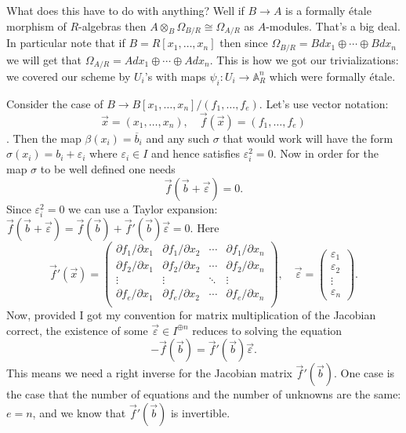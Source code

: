 \documentclass[12pt]{article}
\numberwithin{equation}{section}
\theoremstyle{definition}
\theoremstyle{remark}
\renewcommand{\AA}{\mathbb{A}}
\begin{document}
What does this have to do with anything?
Well if $B \to A$ is a formally \'etale morphism of $R$-algebras then $A\otimes_B \Omega_{B/R} \cong \Omega_{A/R}$ as $A$-modules. 
That's a big deal. 
In particular note that if $B = R[x_1,\ldots,x_n]$ then since $\Omega_{B/R} = B dx_1 \oplus \cdots \oplus B dx_n$ we will get that $\Omega_{A/R} = Adx_1 \oplus \cdots \oplus A dx_n$. 
This is how we got our trivializations: we covered our scheme by $U_i$'s with maps $\psi_i:U_i \to \AA^n_R$ which were formally \'etale. 

Consider the case of $B \to B[x_1,\ldots,x_n]/(f_1,\ldots,f_e)$. 
Let's use vector notation: 
$$\vec{x} = (x_1,\ldots,x_n), \quad \vec{f}(\vec{x}) = (f_1,\ldots,f_e)$$. 
Then the map $\beta(x_i) = \overline{b}_i$ and any such $\sigma$ that would work will have the form $\sigma(x_i) = b_i + \varepsilon_i$ where $\varepsilon_i \in I$ and hence satisfies $\varepsilon_i^2=0$. 
Now in order for the map $\sigma$ to be well defined one needs 
$$ \vec{f}(\vec{b}+\vec{\varepsilon})=0.$$
Since $\varepsilon_i^2=0$ we can use a Taylor expansion: $\vec{f}(\vec{b}+\vec{\varepsilon})=\vec{f}(\vec{b}) + \vec{f}'(\vec{b})\vec{\varepsilon}=0$. 
Here 
$$\vec{f}'(\vec{x}) = \begin{pmatrix}
\partial f_1/\partial x_1 & \partial f_1/\partial x_2 & \cdots & \partial f_1/\partial x_n \\
\partial f_2/\partial x_1 & \partial f_2/\partial x_2 & \cdots & \partial f_2/\partial x_n \\
\vdots & \vdots &\ddots  & \vdots\\
\partial f_e/\partial x_1 & \partial f_e/\partial x_2 & \cdots & \partial f_e/\partial x_n \\
\end{pmatrix}, \quad \vec{\varepsilon} = \begin{pmatrix} \varepsilon_1 \\
\varepsilon_2 \\
\vdots \\
\varepsilon_n
\end{pmatrix}.
$$
Now, provided I got my convention for matrix multiplication of the Jacobian correct, the existence of some $\vec{\varepsilon} \in I^{\oplus n}$ reduces to solving the equation 
\begin{equation}
-\vec{f}(\vec{b}) =\vec{f}'(\vec{b})\vec{\varepsilon}.
\end{equation}
This means we need a right inverse for the Jacobian matrix $\vec{f}'(\vec{b})$. 
One case is the case that the number of equations and the number of unknowns are the same: $e=n$, and we know that $\vec{f}'(\vec{b})$ is invertible. 
\end{document}
